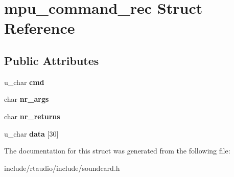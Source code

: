 \hypertarget{structmpu__command__rec}{}\section{mpu\+\_\+command\+\_\+rec Struct Reference}
\label{structmpu__command__rec}
\subsection*{Public Attributes}
\begin{DoxyCompactItemize}
\item 
u\+\_\+char {\bfseries cmd}\hypertarget{structmpu__command__rec_ac43ee56fe540f72d8ec8f3e817be27b5}{}\label{structmpu__command__rec_ac43ee56fe540f72d8ec8f3e817be27b5}

\item 
char {\bfseries nr\+\_\+args}\hypertarget{structmpu__command__rec_a23ce2f696e35266deb18ae9ffd692f55}{}\label{structmpu__command__rec_a23ce2f696e35266deb18ae9ffd692f55}

\item 
char {\bfseries nr\+\_\+returns}\hypertarget{structmpu__command__rec_a3ba0b6a6c0e7994a9f4b719432fa5028}{}\label{structmpu__command__rec_a3ba0b6a6c0e7994a9f4b719432fa5028}

\item 
u\+\_\+char {\bfseries data} \mbox{[}30\mbox{]}\hypertarget{structmpu__command__rec_a4f64c3209757327ed58e3119199c6bb4}{}\label{structmpu__command__rec_a4f64c3209757327ed58e3119199c6bb4}

\end{DoxyCompactItemize}


The documentation for this struct was generated from the following file\+:\begin{DoxyCompactItemize}
\item 
include/rtaudio/include/soundcard.\+h\end{DoxyCompactItemize}
